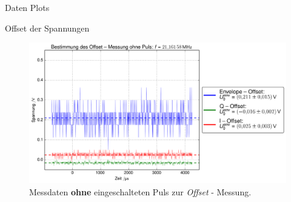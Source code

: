 \begin{appendix}
  \label{chpAnhang}
  
  \begin{chapter}{Daten Plots}
    \label{chpAnhangPlots}
    
    \begin{section}{Offset der Spannungen}
      \label{chpAnhangOffset}
      \begin{figure}[hb]
        \centering
        \includegraphics[width=\textwidth]{Figures/Offset.png}
        \caption{Messdaten \textbf{ohne} eingeschalteten Puls zur
          \textit{Offset} - Messung.}
        \label{AnhangfigOffset}
      \end{figure}
      
    \end{section}
    

\end{chapter}
\end{appendix}
